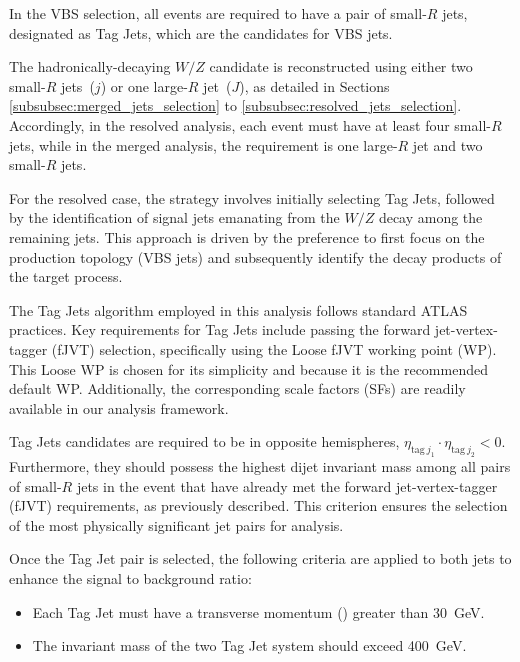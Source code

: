 \label{subsec:vbs_selection}

In the VBS selection, all events are required to have a pair of small-$R$ jets, designated as Tag Jets, which are the candidates for VBS jets.

The hadronically-decaying $W/Z$ candidate is reconstructed using either two small-$R$ jets~($j$) or one large-$R$ jet~($J$), as detailed in Sections \ref{subsubsec:merged_jets_selection} to \ref{subsubsec:resolved_jets_selection}. Accordingly, in the resolved analysis, each event must have at least four small-$R$ jets, while in the merged analysis, the requirement is one large-$R$ jet and two small-$R$ jets.

For the resolved case, the strategy involves initially selecting Tag Jets, followed by the identification of signal jets emanating from the $W/Z$ decay among the remaining jets. This approach is driven by the preference to first focus on the production topology (VBS jets) and subsequently identify the decay products of the target process.

The Tag Jets algorithm employed in this analysis follows standard ATLAS practices. Key requirements for Tag Jets include passing the forward jet-vertex-tagger (fJVT) selection, specifically using the Loose fJVT working point (WP). This Loose WP is chosen for its simplicity and because it is the recommended default WP. Additionally, the corresponding scale factors (SFs) are readily available in our analysis framework.

Tag Jets candidates are required to be in opposite hemispheres, $\eta_{\mathrm{tag}\ j_1} \cdot \eta_{\mathrm{tag}\ j_2} < 0$. Furthermore, they should possess the highest dijet invariant mass among all pairs of small-$R$ jets in the event that have already met the forward jet-vertex-tagger (fJVT) requirements, as previously described. This criterion ensures the selection of the most physically significant jet pairs for analysis.

Once the Tag Jet pair is selected, the following criteria are applied to both jets to enhance the signal to background ratio:
\begin{itemize}
    \item Each Tag Jet must have a transverse momentum (\pt) greater than \SI{30}{\GeV}.
    \item The invariant mass of the two Tag Jet system should exceed \SI{400}{\GeV}.
\end{itemize}

